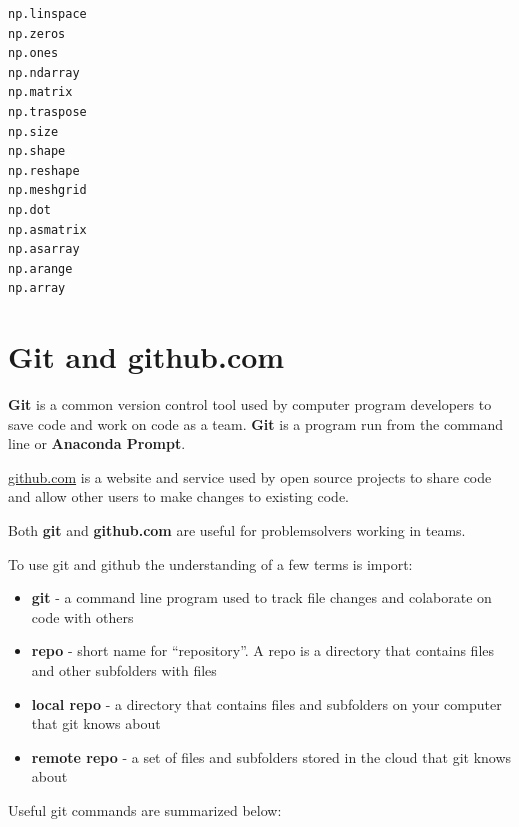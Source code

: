 \documentclass{book}
\providecommand{\tightlist}{%
      \setlength{\itemsep}{0pt}\setlength{\parskip}{0pt}}
\begin{document}
    \begin{lstlisting}
np.linspace
np.zeros
np.ones
np.ndarray
np.matrix
np.traspose
np.size
np.shape
np.reshape
np.meshgrid
np.dot
np.asmatrix
np.asarray
np.arange
np.array
\end{lstlisting}

    \section{Git and github.com}\label{git-and-github.com}

    \textbf{Git} is a common version control tool used by computer program
developers to save code and work on code as a team. \textbf{Git} is a
program run from the command line or \textbf{Anaconda Prompt}.

    \href{https://github.com/}{github.com} is a website and service used by
open source projects to share code and allow other users to make changes
to existing code.

    Both \textbf{git} and \textbf{github.com} are useful for problemsolvers
working in teams.

    To use git and github the understanding of a few terms is import:

\begin{itemize}
\tightlist
\item
  \textbf{git} - a command line program used to track file changes and
  colaborate on code with others
\item
  \textbf{repo} - short name for ``repository''. A repo is a directory
  that contains files and other subfolders with files
\item
  \textbf{local repo} - a directory that contains files and subfolders
  on your computer that git knows about
\item
  \textbf{remote repo} - a set of files and subfolders stored in the
  cloud that git knows about
\end{itemize}

    Useful git commands are summarized below:
\end{document}
